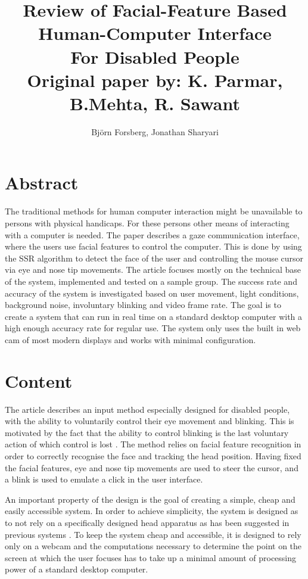 \documentclass[a4paper,10pt]{article}
\title{Review of Facial-Feature Based \\
	Human-Computer Interface \\
	For Disabled People \\
	\vspace{3mm} \normalsize Original paper by: K. Parmar, B.Mehta, R. Sawant}
\author{Bj{\"o}rn Forsberg, Jonathan Sharyari}
\begin{document}
\maketitle


\section{Abstract}

The traditional methods for human computer interaction might be unavailable to persons with physical handicaps. For these persons other means of interacting with a computer is needed. The paper describes a gaze communication interface, where the users use facial features to control the computer. This is done by using the SSR algorithm to detect the face of the user and controlling the mouse cursor via eye and nose tip movements. The article focuses mostly on the technical base of the system,  implemented and tested on a sample group. The success rate and accuracy of the system is investigated based on user movement, light conditions, background noise, involuntary blinking and video frame rate.
The goal is to create a system that can run in real time on a standard desktop computer with a high enough accuracy rate for regular use. The system only uses the built in web cam of most modern displays and works with minimal configuration.

\section{Content}
The article\cite{thepaper} describes an input method especially designed for disabled people, with the ability to voluntarily control their eye movement and blinking. This is motivated by the fact that the ability to control blinking is the last voluntary action of which control is lost \cite{voluntaryblink}. The method relies on facial feature recognition in order to correctly recognise the face and tracking the head position. Having fixed the facial features, eye and nose tip movements are used to steer the cursor, and a blink is used to emulate a click in the user interface.

An important property of the design is the goal of creating a simple, cheap and easily accessible system. In order to achieve simplicity, the system is designed as to not rely on a specifically designed head apparatus as has been suggested in previous systems \cite{goggles1} \cite{goggles2}. To keep the system cheap and accessible, it is designed to rely only on a webcam and the computations necessary to determine the point on the screen at which the user focuses has to take up a minimal amount of processing power of a standard desktop computer. 
\end{document}
